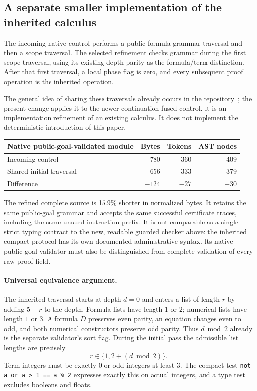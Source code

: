 \documentclass[11pt,letterpaper]{article}
\theoremstyle{definition}\newtheorem{definition}[theorem]{Definition}
\theoremstyle{remark}\newtheorem{remark}[theorem]{Remark}
\begin{document}
\subsection{A separate smaller implementation of the inherited calculus}

The incoming native control performs a public-formula grammar traversal and
then a scope traversal. The selected refinement checks grammar during the
first scope traversal, using its existing depth parity as the formula/term
distinction. After that first traversal, a local phase flag is zero, and
every subsequent proof operation is the inherited operation.

The general idea of sharing these traversals already occurs in the
repository~\cite{scope}; the present change applies it to the newer
continuation-fused control. It is an implementation refinement of an existing
calculus. It does not implement the deterministic introduction of this paper.

\begin{center}
\begin{tabular}{lrrr}\toprule
Native public-goal-validated module & Bytes & Tokens & AST nodes\\\midrule
Incoming control & 780 & 360 & 409\\
Shared initial traversal & 656 & 333 & 379\\
Difference & $-124$ & $-27$ & $-30$\\\bottomrule
\end{tabular}
\end{center}

The refined complete source is 15.9\% shorter in normalized bytes. It retains
the same public-goal grammar and accepts the same successful certificate
traces, including the same unused instruction prefix. It is not comparable
as a single strict typing contract to the new, readable guarded checker above:
the inherited compact protocol has its own documented administrative syntax.
Its native public-goal validator must also be distinguished from complete
validation of every raw proof field.

\paragraph{Universal equivalence argument.}
The inherited traversal starts at depth $d=0$ and enters a list of length
$r$ by adding $5-r$ to the depth. Formula lists have length $1$ or $2$;
numerical lists have length $1$ or $3$. A formula $D$ preserves even parity,
an equation changes even to odd, and both numerical constructors preserve
odd parity. Thus $d\bmod2$ already is the separate validator's sort flag.
During the initial pass the admissible list lengths are precisely
\[
                  r\in\{1,2+(d\bmod2)\}.
\]
Term integers must be exactly $0$ or odd integers at least $3$. The compact
test \texttt{not a or a > 1 == a \% 2} expresses exactly this on actual
integers, and a type test excludes booleans and floats.
\end{document}
